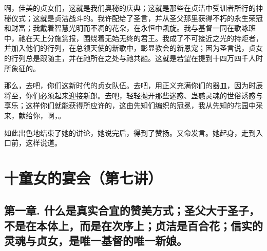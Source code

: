 啊，佳美的贞女们，这就是我们奥秘的庆典；这就是那些在贞洁中受训者所行的神秘仪式；这就是贞洁战斗的。我许配给了圣言，并从圣父那里获得不朽的永生荣冠和财富；我戴着智慧光明而不凋的花朵，在永恒中凯旋。我与基督一同在歌咏班中，祂在天上分施赏报，围绕着无始无终的君王。我成了不可接近之光的持炬者，并加入他们的行列，在总领天使的新歌中，彰显教会的新恩宠；因为圣言说，贞女的行列总是跟随主，并在祂所在之处与祂共融。这就是若望在提到十四万四千人时所象征的。\par

那么，去吧，你们这新时代的贞女队伍。去吧，用正义充满你们的器皿，因为时辰将至，你们必须起来迎接新郎。去吧，轻轻抛开那些迷惑、蛊惑灵魂的世俗诱惑与享乐；这样你们就能获得所应许的，这由先知们编织的冠冕，我从先知的花园中采来，献给你，啊，。\par

如此出色地结束了她的讲论，她说完后，得到了赞扬。又命发言。她起身，走到入口前，这样说道。\par



\section{十童女的宴会（第七讲）}

\par


\subsection{第一章. 什么是真实合宜的赞美方式；圣父大于圣子，不是在本体上，而是在次序上；贞洁是百合花；信实的灵魂与贞女，是唯一基督的唯一新娘。}

